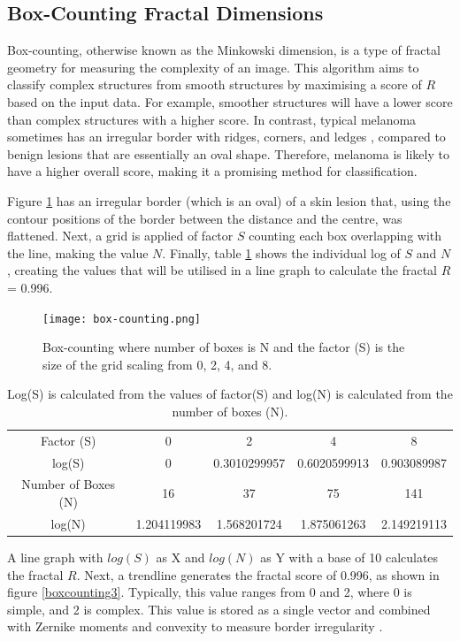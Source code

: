 \documentclass[10.5pt]{report}
\begin{document}
\subsection{Box-Counting Fractal Dimensions}
Box-counting, otherwise known as the Minkowski dimension, is a type of fractal geometry for measuring the complexity of an image. This algorithm aims to classify complex structures from smooth structures by maximising a score of $R$ based on the input data. For example, smoother structures will have a lower score than complex structures with a higher score. In contrast, typical melanoma sometimes has an irregular border with ridges, corners, and ledges \cite{Kaya2016}, compared to benign lesions that are essentially an oval shape. Therefore, melanoma is likely to have a higher overall score, making it a promising method for classification.

Figure \ref{boxcounting} has an irregular border (which is an oval) of a skin lesion that, using the contour positions of the border between the distance and the centre, was flattened. Next, a grid is applied of factor $S$ counting each box overlapping with the line, making the value $N$. Finally, table \ref{boxcounting2} shows the individual log of $S$ and $N$, creating the values that will be utilised in a line graph to calculate the fractal $R$ = 0.996.

\begin{figure}
\texttt{[image: box-counting.png]}
\caption{Box-counting where number of boxes is N and the factor (S) is the size of the grid scaling from 0, 2, 4, and 8.}\label{boxcounting}
\end{figure} 

\begin{table}
\begin{tabular}{ c|c c c c }
 Factor (S) & 0 & 2 & 4 & 8 \\
 log(S) & 0 & 0.3010299957 & 0.6020599913 & 0.903089987 \\
 \hline  
 Number of Boxes (N) & 16 & 37 & 75 & 141 \\
 log(N) & 1.204119983 & 1.568201724 & 1.875061263 & 2.149219113  
\end{tabular}
\caption{Log(S) is calculated from the values of factor(S) and log(N) is calculated from the number of boxes (N).} \label{boxcounting2}
\end{table}

A line graph with $log(S)$ as X and $log(N)$ as Y with a base of 10 calculates the fractal $R$. Next, a trendline generates the fractal score of 0.996, as shown in figure \ref{boxcounting3}. Typically, this value ranges from 0 and 2, where 0 is simple, and 2 is complex. This value is stored as a single vector and combined with Zernike moments and convexity to measure border irregularity \cite{Ali2020b}.
\end{document}
